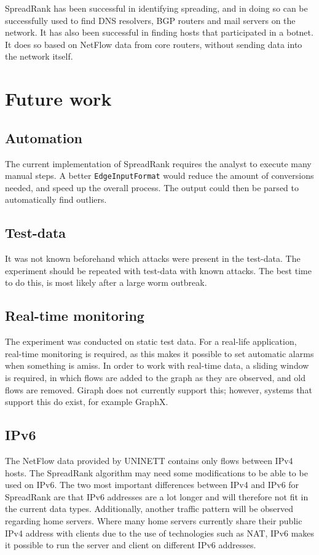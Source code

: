 SpreadRank has been successful in identifying spreading, and in doing so can be successfully used to find DNS resolvers,
 BGP routers and mail servers on the network.
It has also been successful in finding hosts that participated in a botnet.
It does so based on NetFlow data from core routers, without sending data into the network itself.

\section{Future work}
\subsection{Automation}
The current implementation of SpreadRank requires the analyst to execute many manual steps.
A better \verb"EdgeInputFormat" would reduce the amount of conversions needed,
 and speed up the overall process.
The output could then be parsed to automatically find outliers.

\subsection{Test-data}
It was not known beforehand which attacks were present in the test-data.
The experiment should be repeated with test-data with known attacks.
The best time to do this, is most likely after a large worm outbreak.

\subsection{Real-time monitoring}
The experiment was conducted on static test data.
For a real-life application, real-time monitoring is required,
 as this makes it possible to set automatic alarms when something is amiss.
In order to work with real-time data, a sliding window is required,
 in which flows are added to the graph as they are observed,
and old flows are removed.
Giraph does not currently support this; however, systems that support this do exist, for example GraphX.

\subsection{IPv6}
The NetFlow data provided by UNINETT contains only flows between IPv4 hosts.
The SpreadRank algorithm may need some modifications to be able to be used on IPv6.
The two most important differences between IPv4 and IPv6 for SpreadRank are that IPv6 addresses are a lot longer and will therefore not fit in the current data types.
Additionally, another traffic pattern will be observed regarding home servers.
Where many home servers currently share their public IPv4 address with clients due to the use of technologies such as NAT,
 IPv6 makes it possible to run the server and client on different IPv6 addresses.

